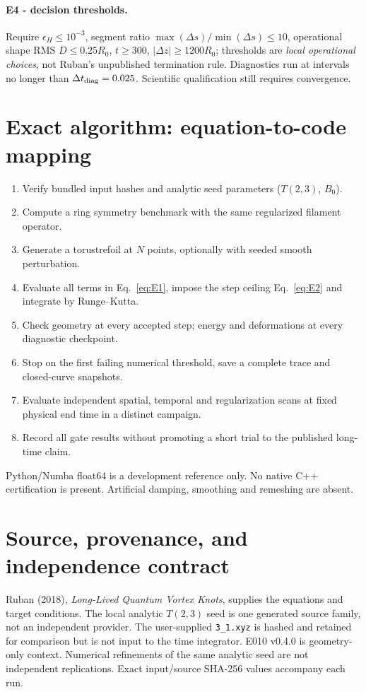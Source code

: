 \documentclass[11pt,a4paper]{article}
\begin{document}
\paragraph{E4 - decision thresholds.} Require $\epsilon_H\le10^{-3}$, segment ratio $\max(\Delta s)/\min(\Delta s)\le10$, operational shape RMS $D\le0.25R_0$, $t\ge300$, $|\Delta z|\ge1200R_0$; thresholds are \emph{local operational choices}, not Ruban's unpublished termination rule. Diagnostics run at intervals no longer than $\Delta t_{\rm diag}=0.025$. Scientific qualification still requires convergence.


\section{Exact algorithm: equation-to-code mapping}
\begin{enumerate}[label=S\arabic*.]
\item Verify bundled input hashes and analytic seed parameters ($T(2,3)$, $B_0$).
\item Compute a ring symmetry benchmark with the same regularized filament operator.
\item Generate a torustrefoil at $N$ points, optionally with seeded smooth perturbation.
\item Evaluate all terms in Eq.~\eqref{eq:E1}, impose the step ceiling Eq.~\eqref{eq:E2} and integrate by Runge--Kutta.
\item Check geometry at every accepted step; energy and deformations at every diagnostic checkpoint.
\item Stop on the first failing numerical threshold, save a complete trace and closed-curve snapshots.
\item Evaluate independent spatial, temporal and regularization scans at fixed physical end time in a distinct campaign.
\item Record all gate results without promoting a short trial to the published long-time claim.
\end{enumerate}
\noindent Python/Numba float64 is a development reference only. No native C++ certification is present. Artificial damping, smoothing and remeshing are absent.


\section{Source, provenance, and independence contract}
Ruban (2018), \emph{Long-Lived Quantum Vortex Knots}, supplies the equations and target conditions. The local analytic $T(2,3)$ seed is one generated source family, not an independent provider. The user-supplied \texttt{3\_1.xyz} is hashed and retained for comparison but is not input to the time integrator. E010 v0.4.0 is geometry-only context. Numerical refinements of the same analytic seed are not independent replications. Exact input/source SHA-256 values accompany each run.
\end{document}
